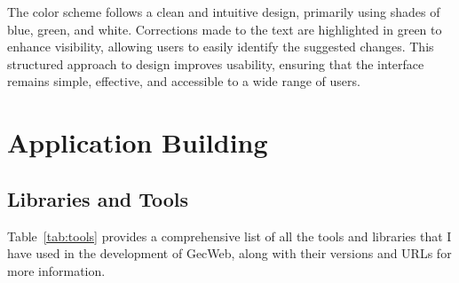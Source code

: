 The color scheme follows a clean and intuitive design, primarily using shades of blue, green, and white.
Corrections made to the text are highlighted in green to enhance visibility, allowing users to easily identify the suggested changes.
This structured approach to design improves usability, ensuring that the interface remains simple, effective, and accessible to a wide range of users.

\section{Application Building}

\subsection{Libraries and Tools}

Table~\ref{tab:tools} provides a comprehensive list of all the tools and libraries that I have used in the development of GecWeb, along with their versions and URLs for more information.

